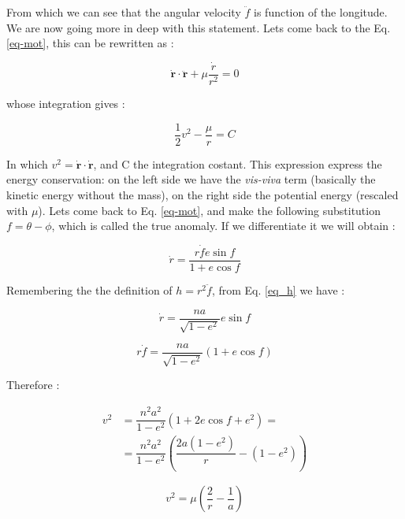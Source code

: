 \documentclass[12pt,%
               a4paper,%
               oneside,openany,%
               titlepage,%
               headinclude,footinclude,%
               BCOR5mm,%
               cleardoublepage=empty,%
               tablecaptionabove,%
               floatperchapter,
               ]{scrreprt}                 %
\begin{document}
From which we can see that the angular velocity $\ddot{f}$ is function of the longitude. We are now going more in deep with this statement. Lets come back to the Eq. \ref{eq-mot}, this can be rewritten as \cite{murray1999solar}:

\begin{equation}
\dot{\textbf{r}}\cdot\ddot{\textbf{r}}+\mu\dfrac{\dot{r}}{r^{2}}=0
\end{equation}

whose integration gives \cite{murray1999solar}:

\begin{equation}
\frac{1}{2}v^{2}-\frac{\mu}{r}=C
\label{energy_cons}
\end{equation}

In which $v^{2}=\dot{\textbf{r}}\cdot\dot{\textbf{r}}$, and C the integration costant. This expression express the energy conservation: on the left side we have the \textit{vis-viva} term (basically the kinetic energy without the mass), on the right side the potential energy (rescaled with $\mu$). Lets come back to Eq. \ref{eq-mot}, and make the following substitution $f=\theta-\phi$, which is called the true anomaly. If we differentiate it we will obtain \cite{murray1999solar}:

\begin{equation}
\dot{r}=\frac{r\dot{f}e\sin f}{1+e\cos f}
\end{equation}


Remembering the the definition of $h=r^{2}\ddot{f}$, from Eq. \ref{eq_h} we have  \cite{murray1999solar}:

\begin{equation}
\dot{r}=\frac{na}{\sqrt{1-e^{2}}}e\sin f
\end{equation}

\begin{equation}
r\dot{f}=\frac{na}{\sqrt{1-e^{2}}}\left(1+e\cos f\right)
\end{equation}

Therefore \cite{murray1999solar}:


\begin{equation}
\begin{split}
v^{2}&=\dfrac{n^{2}a^{2}}{1-e^{2}}\left(1+2e\cos f +e^{2}\right)= \\
&=\dfrac{n^{2}a^{2}}{1-e^{2}}\left(\dfrac{2a(1-e^{2})}{r}-(1-e^{2})\right)
\end{split}
\end{equation}

\begin{equation}
v^{2}=\mu\left(\frac{2}{r}-\dfrac{1}{a}\right)
\end{equation}
\end{document}
